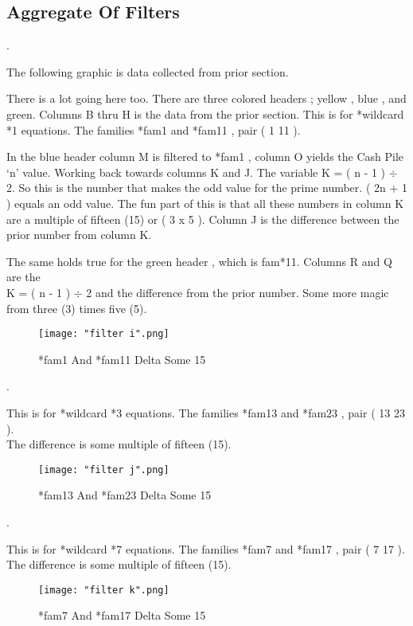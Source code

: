 \subsection{Aggregate Of Filters}
.
\par 
The following graphic is data collected from prior section.
\\
\par 
There is a lot going here too. There are three colored headers ; yellow , blue , and green. Columns B thru H is the data from the prior section. This is for *wild\textendash card  *1 equations. The families *fam1 and *fam11 , pair ( 1 11 ). 
\\
\par 
In the blue header column M is filtered to *fam1 , column O yields the Cash Pile `n' value. Working back towards columns K and J. The variable K = ( n - 1 ) $\div$ 2. So this is the number that makes the odd value for the prime number. ( 2n + 1 ) equals an odd value. The fun part of this is that all these numbers in column K are a multiple of fifteen (15) or ( 3 x 5 ). Column J is the difference between the prior number from column K.
\\
\par
The same holds true for the green header , which is fam*11. Columns R and Q are the 
\\ K = ( n - 1 ) $\div$ 2 and the difference from the prior number. Some more magic from three (3) times five (5).
\begin{figure}[h]
    \centering
    \texttt{[image: "filter i".png]}
    \caption{*fam1 And *fam11 Delta Some 15 }
\end{figure}
\pagebreak


\par 
.
\par 
This is for *wild\textendash card  *3 equations. The families *fam13 and *fam23 , pair ( 13 23 ). 
\\
The difference is some multiple of fifteen (15).
\begin{figure}[h]
    \centering
    \texttt{[image: "filter j".png]}
    \caption{*fam13 And *fam23 Delta Some 15 }
\end{figure}
\pagebreak

\par 
.
\par 
This is for *wild\textendash card  *7 equations. The families *fam7 and *fam17 , pair ( 7 17 ). 
\\
The difference is some multiple of fifteen (15).
\begin{figure}[h]
    \centering
    \texttt{[image: "filter k".png]}
    \caption{*fam7 And *fam17 Delta Some 15 }
\end{figure}
\pagebreak


